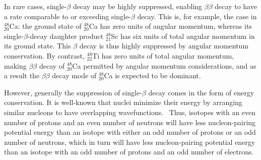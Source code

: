 In rare cases, single-$\beta$ decay may be highly suppressed, enabling $\beta\beta$ decay to have a rate comparable to or exceeding single-$\beta$ decay.  This is, for example, the case in $^{48}_{20}$Ca: the ground state of $^{48}_{20}$Ca has zero units of angular momentum, whereas its single-$\beta$-decay daughter product $^{48}_{21}$Sc has six units of total angular momentum in its ground state.  This $\beta$ decay is thus highly suppressed by angular momentum conservation.  By contrast, $^{48}_{22}$Ti has zero units of total angular momentum, making $\beta\beta$ decay of $^{48}_{20}$Ca permitted by angular momentum considerations, and as a result the $\beta\beta$ decay mode of $^{48}_{20}$Ca is expected to be dominant.~\cite{MyNuclearPhysicsBook}

However, generally the suppression of single-$\beta$ decay comes in the form of energy conservation.  It is well-known that nuclei minimize their energy by arranging similar nucleons to have overlapping wavefunctions.~\cite{MyNuclearPhysicsBook}  Thus, isotopes with an even number of protons and an even number of neutrons will have less nucleon-pairing potential energy than an isotope with either an odd number of protons or an odd number of neutrons, which in turn will have less nucleon-pairing potential energy than an isotope with an odd number of protons and an odd number of electrons.

